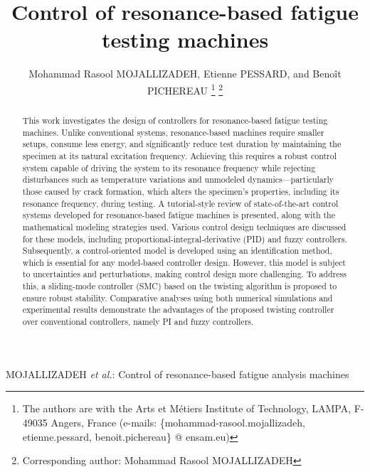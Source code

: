 \documentclass[lettersize,journal]{IEEEtran}
\begin{document}
\title{Control of resonance-based fatigue testing  machines}

\author{Mohammad Rasool MOJALLIZADEH, Etienne PESSARD, and Benoît PICHEREAU
\thanks{The authors are with the Arts et Métiers Institute of Technology, LAMPA, F-49035 Angers, France (e-mails: \{mohammad-rasool.mojallizadeh, etienne.pessard, benoit.pichereau\} @ ensam.eu)}
\thanks{Corresponding author: Mohammad Rasool MOJALLIZADEH}
}

%
{MOJALLIZADEH \MakeLowercase{\textit{et al.}}: Control of resonance-based fatigue analysis machines}


\maketitle

\begin{abstract}
This work investigates the design of controllers for resonance-based fatigue testing machines. Unlike conventional systems, resonance-based machines require smaller setups, consume less energy, and significantly reduce test duration by maintaining the specimen at its natural excitation frequency. Achieving this requires a robust control system capable of driving the system to its resonance frequency while rejecting disturbances such as temperature variations and unmodeled dynamics—particularly those caused by crack formation, which alters the specimen’s properties, including its resonance frequency, during testing. A tutorial-style review of state-of-the-art control systems developed for resonance-based fatigue machines is presented, along with the mathematical modeling strategies used. Various control design techniques are discussed for these models, including proportional-integral-derivative (PID) and fuzzy controllers. Subsequently, a control-oriented model is developed using an identification method, which is essential for any model-based controller design. However, this model is subject to uncertainties and perturbations, making control design more challenging. To address this, a sliding-mode controller (SMC) based on the twisting algorithm is proposed to ensure robust stability. Comparative analyses using both numerical simulations and experimental results demonstrate the advantages of the proposed twisting controller over conventional controllers, namely PI and fuzzy controllers.
\end{abstract}
\end{document}
